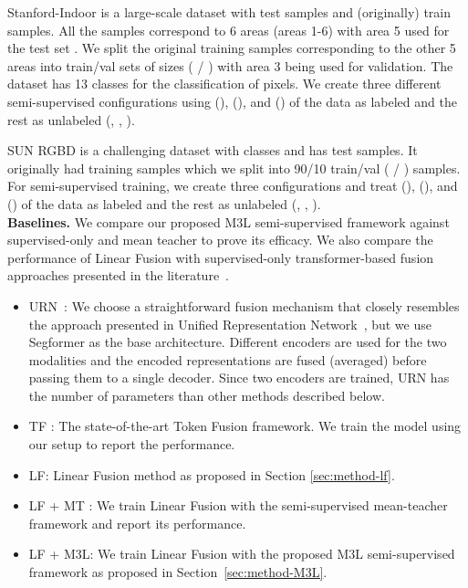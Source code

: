 \documentclass[10pt,twocolumn,letterpaper]{article}
\begin{document}
Stanford-Indoor \cite{stanfordindoor} is a large-scale dataset with  test samples and (originally)  train samples. 
All the samples correspond to 6 areas (areas 1-6) with area 5 used for the test set \cite{stanfordindoor}. 
We split the original  training samples corresponding to the other 5 areas into train/val sets of sizes ( / ) with area 3 being used for validation. 
The dataset has 13 classes for the classification of pixels. 
We create three different semi-supervised configurations using  (),  (), and  () of the data as labeled and the rest as unlabeled (, , ).

SUN RGBD is a challenging dataset with  classes and has  test samples. 
It originally had  training samples which we split into 90/10 train/val ( / ) samples. 
For semi-supervised training, we create three configurations and treat  (),  (), and  () of the data as labeled and the rest as unlabeled (, , ). \\

\noindent\textbf{Baselines.} We compare our proposed M3L semi-supervised framework against supervised-only and mean teacher \cite{mt} to prove its efficacy. We also compare the performance of Linear Fusion with supervised-only transformer-based fusion approaches presented in the literature~\cite{tokenfusion, urn}. 
\begin{itemize}[leftmargin=*]
    \item URN~\cite{urn}: We choose a straightforward fusion mechanism that closely resembles the approach presented in Unified Representation Network~\cite{urn}, but we use Segformer as the base architecture. Different encoders are used for the two modalities and the encoded representations are fused (averaged) before passing them to a single decoder. Since two encoders are trained, URN has  the number of parameters than other methods described below.
    \item TF \cite{tokenfusion}: The state-of-the-art Token Fusion \cite{tokenfusion} framework. We train the model using our setup to report the performance.
    \item LF: Linear Fusion method as proposed in Section \ref{sec:method-lf}.
    \item LF + MT \cite{mt}: We train Linear Fusion with the semi-supervised mean-teacher \cite{mt} framework and report its performance. 
    \item LF + M3L: We train Linear Fusion with the proposed M3L semi-supervised framework as proposed in Section~\ref{sec:method-M3L}.
\end{itemize}
\end{document}
